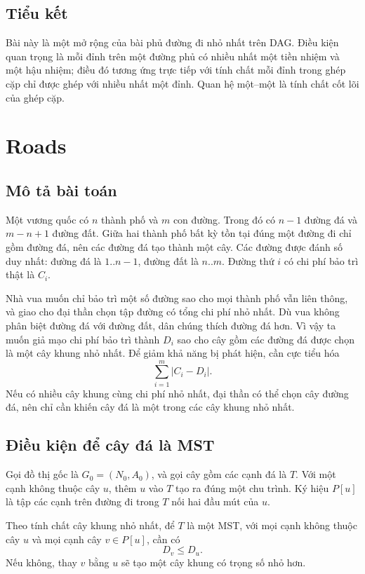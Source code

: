 \documentclass[11pt]{article}
\begin{document}
\subsection{Tiểu kết}

Bài này là một mở rộng của bài phủ đường đi nhỏ nhất trên DAG. Điều kiện quan
trọng là mỗi đỉnh trên một đường phủ có nhiều nhất một tiền nhiệm và một hậu
nhiệm; điều đó tương ứng trực tiếp với tính chất mỗi đỉnh trong ghép cặp chỉ
được ghép với nhiều nhất một đỉnh. Quan hệ một--một là tính chất cốt lõi của
ghép cặp.

\section{Roads}

\subsection{Mô tả bài toán}

Một vương quốc có $n$ thành phố và $m$ con đường. Trong đó có $n-1$ đường đá
và $m-n+1$ đường đất. Giữa hai thành phố bất kỳ tồn tại đúng một đường đi chỉ
gồm đường đá, nên các đường đá tạo thành một cây. Các đường được đánh số duy
nhất: đường đá là $1..n-1$, đường đất là $n..m$. Đường thứ $i$ có chi phí bảo
trì thật là $C_i$.

Nhà vua muốn chỉ bảo trì một số đường sao cho mọi thành phố vẫn liên thông,
và giao cho đại thần chọn tập đường có tổng chi phí nhỏ nhất. Dù vua không
phân biệt đường đá với đường đất, dân chúng thích đường đá hơn. Vì vậy ta muốn
giả mạo chi phí bảo trì thành $D_i$ sao cho cây gồm các đường đá được chọn là
một cây khung nhỏ nhất. Để giảm khả năng bị phát hiện, cần cực tiểu hóa
\[
  \sum_{i=1}^{m}|C_i-D_i|.
\]
Nếu có nhiều cây khung cùng chi phí nhỏ nhất, đại thần có thể chọn cây đường
đá, nên chỉ cần khiến cây đá là một trong các cây khung nhỏ nhất.

\subsection{Điều kiện để cây đá là MST}

Gọi đồ thị gốc là $G_0=(N_0,A_0)$, và gọi cây gồm các cạnh đá là $T$. Với một
cạnh không thuộc cây $u$, thêm $u$ vào $T$ tạo ra đúng một chu trình. Ký hiệu
$P[u]$ là tập các cạnh trên đường đi trong $T$ nối hai đầu mút của $u$.

Theo tính chất cây khung nhỏ nhất, để $T$ là một MST, với mọi cạnh không thuộc
cây $u$ và mọi cạnh cây $v\in P[u]$, cần có
\[
  D_v\le D_u.
\]
Nếu không, thay $v$ bằng $u$ sẽ tạo một cây khung có trọng số nhỏ hơn.
\end{document}
